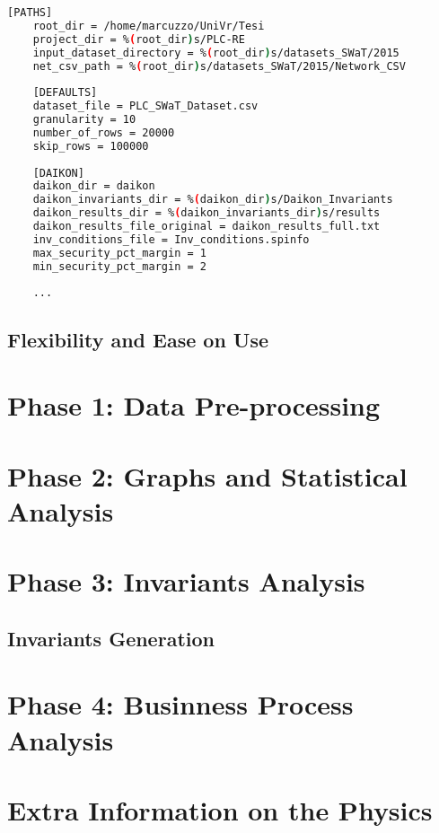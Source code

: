\begin{lstlisting}[language=bash, numbers=none, caption=Example of \textit{config.ini} file, label=lst:config_ini_example]	
	[PATHS]
	root_dir = /home/marcuzzo/UniVr/Tesi
	project_dir = %(root_dir)s/PLC-RE
	input_dataset_directory = %(root_dir)s/datasets_SWaT/2015
	net_csv_path = %(root_dir)s/datasets_SWaT/2015/Network_CSV
	
	[DEFAULTS]
	dataset_file = PLC_SWaT_Dataset.csv
	granularity = 10
	number_of_rows = 20000
	skip_rows = 100000
	
	[DAIKON]
	daikon_dir = daikon
	daikon_invariants_dir = %(daikon_dir)s/Daikon_Invariants
	daikon_results_dir = %(daikon_invariants_dir)s/results
	daikon_results_file_original = daikon_results_full.txt
	inv_conditions_file = Inv_conditions.spinfo
	max_security_pct_margin = 1
	min_security_pct_margin = 2
	
	...
\end{lstlisting}

\subsection{Flexibility and Ease on Use}
\label{subsec:framework_flex}

\section{Phase 1: Data Pre-processing}
\label{sec:improve_preprocessing}

\section{Phase 2: Graphs and Statistical Analysis}
\label{sec:improve_graphs}

\section{Phase 3: Invariants Analysis}
\label{sec:improve_invariants}

\subsection{Invariants Generation}

\section{Phase 4: Businness Process Analysis}
\label{sec:improve_bpa}

\section{Extra Information on the Physics}
\label{sec:extra_info}

\vfill
\nolinenumbers